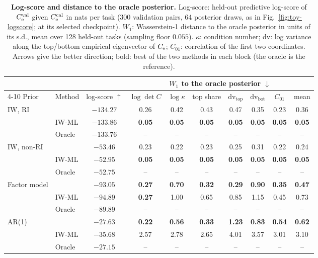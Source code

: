 \begin{table}[t]
  \centering
  \caption{\textbf{Log-score and distance to the oracle posterior.}
  Log-score: held-out predictive log-score of $C_{\mathrm{e}}^{\mathrm{val}}$ given $C_{\mathrm{e}}^{\mathrm{cal}}$ in nats per task (300 validation pairs, 64 posterior draws, as in Fig.~\ref{fig:toy-logscore}; \scsi{} at its selected checkpoint).
  $W_1$: Wasserstein-1 distance to the oracle posterior in units of its s.d., mean over 128 held-out tasks (sampling floor $0.055$).
  $\kappa$: condition number; $\mathrm{dv}$: log variance along the top/bottom empirical eigenvector of $C_{\mathrm{e}}$; $C_{01}$: correlation of the first two coordinates.
  Arrows give the better direction; bold: best of the two methods in each block (the oracle is the reference).}
  \label{tab:toy-w1}
  \footnotesize
  \setlength{\tabcolsep}{2.8pt}
  \begin{tabular}{@{}llcccccccc@{}}
    \toprule
     & & & \multicolumn{7}{c}{$W_1$ to the oracle posterior $\downarrow$} \\
    \cmidrule(l){4-10}
    Prior & Method & log-score $\uparrow$ & $\log\det C$ & $\log\kappa$ & top share & $\mathrm{dv}_{\mathrm{top}}$ & $\mathrm{dv}_{\mathrm{bot}}$ & $C_{01}$ & mean \\
    \midrule
    IW, RI & \scsi{} & $-134.27$ & 0.26 & 0.42 & 0.43 & 0.47 & 0.35 & 0.23 & 0.36 \\
     & IW-ML & $\mathbf{-133.86}$ & \textbf{0.05} & \textbf{0.05} & \textbf{0.05} & \textbf{0.05} & \textbf{0.05} & \textbf{0.05} & \textbf{0.05} \\
     & Oracle & $-133.76$ & -- & -- & -- & -- & -- & -- & -- \\
    \midrule
    IW, non-RI & \scsi{} & $-53.46$ & 0.23 & 0.22 & 0.23 & 0.25 & 0.31 & 0.22 & 0.24 \\
     & IW-ML & $\mathbf{-52.95}$ & \textbf{0.05} & \textbf{0.05} & \textbf{0.05} & \textbf{0.05} & \textbf{0.05} & \textbf{0.05} & \textbf{0.05} \\
     & Oracle & $-52.75$ & -- & -- & -- & -- & -- & -- & -- \\
    \midrule
    Factor model & \scsi{} & $\mathbf{-93.05}$ & \textbf{0.27} & \textbf{0.70} & \textbf{0.32} & \textbf{0.29} & \textbf{0.90} & \textbf{0.35} & \textbf{0.47} \\
     & IW-ML & $-94.89$ & \textbf{0.27} & 1.00 & 0.65 & 0.85 & 1.15 & 0.45 & 0.73 \\
     & Oracle & $-89.89$ & -- & -- & -- & -- & -- & -- & -- \\
    \midrule
    AR(1) & \scsi{} & $\mathbf{-27.63}$ & \textbf{0.22} & \textbf{0.56} & \textbf{0.33} & \textbf{1.23} & \textbf{0.83} & \textbf{0.54} & \textbf{0.62} \\
     & IW-ML & $-35.68$ & 2.57 & 2.78 & 2.65 & 4.01 & 3.57 & 3.01 & 3.10 \\
     & Oracle & $-27.15$ & -- & -- & -- & -- & -- & -- & -- \\
    \bottomrule
  \end{tabular}
\end{table}

